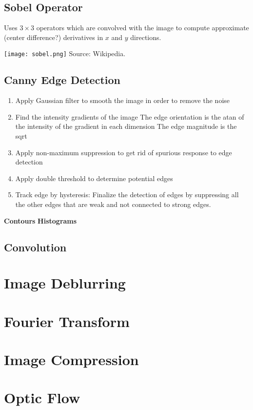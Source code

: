 \subsection{Sobel Operator}
Uses $3\times3$ operators which are convolved with the image to compute approximate (center difference?) derivatives in $x$ and $y$ directions.

\texttt{[image: sobel.png]}
Source: Wikipedia.

\subsection{Canny Edge Detection}
\begin{enumerate}
\item Apply Gaussian filter to smooth the image in order to remove the noise
\item Find the intensity gradients of the image
	The edge orientation is the atan of the intensity of the gradient in each dimension
	The edge magnitude is the sqrt
\item Apply non-maximum suppression to get rid of spurious response to edge detection
\item Apply double threshold to determine potential edges
\item Track edge by hysteresis: Finalize the detection of edges by suppressing all the other edges that are weak and not connected to strong edges.
\end{enumerate}

\textbf{Contours}
\textbf{Histograms}

\subsection{Convolution}

\section{Image Deblurring}

\section{Fourier Transform}

\section{Image Compression}

\section{Optic Flow}

